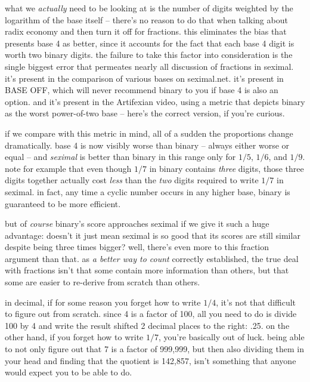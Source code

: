 \documentclass[../best.tex]{subfiles}
\begin{document}
what we \emph{actually} need to be looking at is the number of digits weighted by the logarithm of the base itself -- there's no reason to do that when talking about radix economy and then turn it off for fractions.\myfootnote{} this eliminates the bias that presents base 4 as better, since it accounts for the fact that each base 4 digit is worth two binary digits. the failure to take this factor into consideration is the single biggest error that permeates nearly all discussion of fractions in seximal. it's present in the comparison of various bases on seximal.net. it's present in BASE OFF, which will never recommend binary to you if base 4 is also an option. and it's present in the Artifexian video, using a metric that depicts binary as the worst power-of-two base -- here's the correct version, if you're curious.

if we compare with this metric in mind, all of a sudden the proportions change dramatically. base 4 is now visibly worse than binary -- always either worse or equal -- and \emph{seximal} is better than binary in this range only for $1/5$, $1/6$, and $1/9$.\myfootnote{} note for example that even though $1/7$ in binary contains \emph{three} digits, those three digits together actually cost \emph{less} than the \emph{two} digits required to write $1/7$ in seximal. in fact, any time a cyclic number occurs in any higher base, binary is guaranteed to be more efficient.\myfootnote{}

but of \emph{course} binary's score approaches seximal if we give it such a huge advantage: doesn't it just mean seximal is so good that its scores are still similar despite being three times bigger? well, there's even more to this fraction argument than that. as {\it a better way to count} correctly established, the true deal with fractions isn't that some contain more information than others, but that some are easier to re-derive from scratch than others.

in decimal, if for some reason you forget how to write $1/4$, it's not that difficult to figure out from scratch. since 4 is a factor of 100, all you need to do is divide 100 by 4 and write the result shifted 2 decimal places to the right: .25. on the other hand, if you forget how to write $1/7$, you're basically out of luck. being able to not only figure out that 7 is a factor of 999,999, but then also dividing them in your head and finding that the quotient is 142,857, isn't something that anyone would expect you to be able to do.
\end{document}
